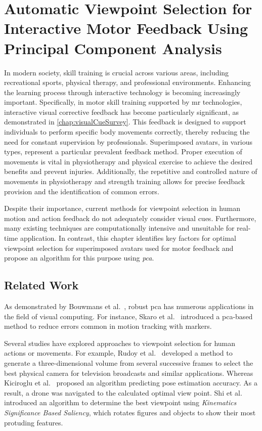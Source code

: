 
\chapter[Automatic Viewpoint Selection for Interactive Motor Feedback Using PCA]{Automatic Viewpoint Selection for Interactive Motor Feedback Using Principal Component Analysis\label{chap:viewpoint}}
In modern society, skill training is crucial across various areas, including recreational sports, physical therapy, and professional environments. Enhancing the learning process through interactive technology is becoming increasingly important. Specifically, in motor skill training supported by \acrshort{mr} technologies, interactive visual corrective feedback has become particularly significant, as demonstrated in \autoref{chap:visualCueSurvey}. This feedback is designed to support individuals to perform specific body movements correctly, thereby reducing the need for constant supervision by professionals. Superimposed avatars, in various types, represent a particular prevalent feedback method. Proper execution of movements is vital in physiotherapy and physical exercise to achieve the desired benefits and prevent injuries. Additionally, the repetitive and controlled nature of movements in physiotherapy and strength training allows for precise feedback provision and the identification of common errors.

Despite their importance, current methods for viewpoint selection in human motion and action feedback do not adequately consider visual cues. Furthermore, many existing techniques are computationally intensive and unsuitable for real-time application. In contrast, this chapter identifies key factors for optimal viewpoint selection for superimposed avatars used for motor feedback and propose an algorithm for this purpose using \emph{\acrshort{pca}}.

\section{Related Work \label{sec:relView}}
As demonstrated by Bouwmans et al.~\cite{bouwmans2018arpca}, robust \acrshort{pca} has numerous applications in the field of visual computing. For instance, Skaro et al.~\cite{skaro2021knac} introduced a \acrshort{pca}-based method to reduce errors common in motion tracking with markers.

Several studies have explored approaches to viewpoint selection for human actions or movements. For example, Rudoy et al.~\cite{rudoy2011vsh} developed a method to generate a three-dimensional volume from several successive frames to select the best physical camera for television broadcasts and similar applications. Whereas Kiciroglu et al.~\cite{kiciroglu2020amc} proposed an algorithm predicting pose estimation accuracy. As a result, a drone was navigated to the calculated optimal view point. Shi et al.~\cite{shi2012ksb} introduced an algorithm to determine the best viewpoint using \emph{Kinematics Significance Based Saliency}, which rotates figures and objects to show their most protuding features.

